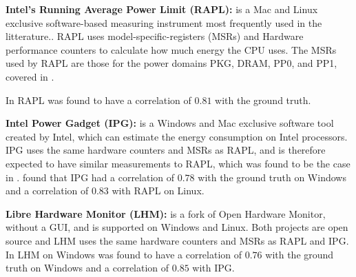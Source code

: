 \noindent\textbf{Intel's Running Average Power Limit (RAPL):} is a Mac and Linux exclusive software-based measuring instrument most frequently used in the litterature.\cite{biksbois}. RAPL uses model-specific-registers (MSRs) and Hardware performance counters to calculate how much energy the CPU uses. The MSRs used by RAPL are those for the power domains PKG, DRAM, PP0, and PP1, covered in \cite{biksbois}. 

In \cite{biksbois} RAPL was found to have a correlation of $0.81$ with the ground truth.\cite{biksbois}\newline

\noindent\textbf{Intel Power Gadget (IPG):} is a Windows and Mac exclusive software tool created by Intel, which can estimate the energy consumption on Intel processors. %
IPG uses the same hardware counters and MSRs as RAPL\cite{FireFox}, and is therefore expected to have similar measurements to RAPL, which was found to be the case in \cite{biksbois}. \cite{biksbois} found that IPG had a correlation of $0.78$ with the ground truth on Windows and a correlation of $0.83$ with RAPL on Linux.\cite{biksbois}\newline





\noindent\textbf{Libre Hardware Monitor (LHM):} is a fork of Open Hardware Monitor, without a GUI, and is supported on Windows and Linux.\cite{LHM} Both projects are open source and LHM uses the same hardware counters and MSRs as RAPL and IPG. %
In \cite{biksbois} LHM on Windows was found to have a correlation of $0.76$ with the ground truth on Windows and a correlation of $0.85$ with IPG.\newline

